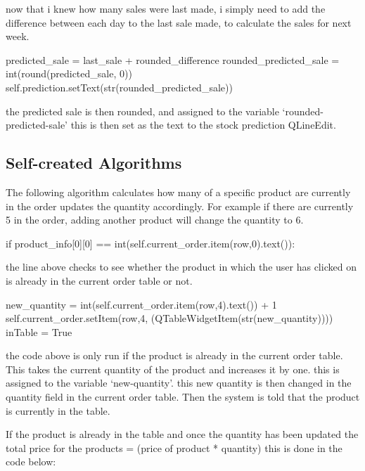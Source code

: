 now that i knew how many sales were last made, i simply need to add the difference between each day to the last sale made, to calculate the sales for next week.

\begin{python}
predicted_sale = last_sale + rounded_difference
rounded_predicted_sale = int(round(predicted_sale, 0))
self.prediction.setText(str(rounded_predicted_sale))
\end{python}

the predicted sale is then rounded, and assigned to the variable `rounded-predicted-sale' this is then set as the text to the stock prediction QLineEdit.

\subsection{Self-created Algorithms}

The following algorithm calculates how many of a specific product are currently in the order updates the quantity accordingly. For example if there are currently 5 in the order, adding another product will change the quantity to 6.


\begin{python}
if product_info[0][0] == int(self.current_order.item(row,0).text()):
\end{python}

the line above checks to see whether the product in which the user has clicked on is already in the current order table or not.

\begin{python}
new_quantity = int(self.current_order.item(row,4).text()) + 1
self.current_order.setItem(row,4, (QTableWidgetItem(str(new_quantity))))
inTable  = True
\end{python}

the code above is only run if the product is already in the current order table. This takes the current quantity of the product and increases it by one. this is assigned to the variable `new-quantity'. this new quantity is then changed in the quantity field in the current order table. Then the system is told that the product is currently in the table.

If the product is already in the table and once the quantity has been updated the total price for the products = (price of product * quantity) this is done in the code below:

